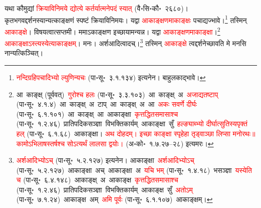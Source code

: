 \begin{sloppypar}
यथा कौमुद्यां \textcolor{red}{क्रिया\-विनिमये द्योत्ये कर्तर्यात्मनेपदं स्यात्} (वै॰सि॰कौ॰~२६८०)। कृत\-भगवद्दर्शनस्यान्यत्काङ्क्षणं स्पष्टं क्रिया\-विनिमयः। यद्वा \textcolor{red}{आकाङ्क्षणमाकाङ्क्षः} पचाद्यज्भावे।\footnote{\textcolor{red}{नन्दि\-ग्रहि\-पचादिभ्यो ल्युणिन्यचः} (पा॰सू॰~३.१.१३४) इत्यनेन। बाहुलकाद्भावे।} तस्मिन् \textcolor{red}{आकाङ्क्षे}। विषयत्वात्सप्तमी। ममाऽकाङ्क्षण इच्छायामन्यन्न। यद्वा \textcolor{red}{आकाङ्क्षणमाकाङ्क्षा}।\footnote{आ~काङ्क्ष् (पूर्ववत्)~\arrow \textcolor{red}{गुरोश्च हलः} (पा॰सू॰~३.३.१०३)~\arrow आ~काङ्क्ष्~अ~\arrow \textcolor{red}{अजाद्यतष्टाप्‌} (पा॰सू॰~४.१.४)~\arrow आ~काङ्क्ष्~अ~टाप्~\arrow आ~काङ्क्ष्~अ~आ~\arrow \textcolor{red}{अकः सवर्णे दीर्घः} (पा॰सू॰~६.१.१०१)~\arrow आ~काङ्क्ष्~आ~\arrow आकाङ्क्षा~\arrow \textcolor{red}{कृत्तद्धित\-समासाश्च} (पा॰सू॰~१.२.४६)~\arrow प्रातिपदिक\-सञ्ज्ञा~\arrow विभक्ति\-कार्यम्~\arrow आकाङ्क्षा~सुँ~\arrow \textcolor{red}{हल्ङ्याब्भ्यो दीर्घात्सुतिस्यपृक्तं हल्} (पा॰सू॰~६.१.६८)~\arrow आकाङ्क्षा। \textcolor{red}{अथ दोहदम्। इच्छा काङ्क्षा स्पृहेहा तृड्वाञ्छा लिप्सा मनोरथः॥ कामोऽभिलाषस्तर्षश्च सोऽत्यर्थं लालसा द्वयोः।} (अ॰को॰~१.७.२७–२८) इत्यमरः।} \textcolor{red}{आकाङ्क्षाऽस्त्यस्येत्याकाङ्क्षम्}। मनः। अर्शआदित्वादच्।\footnote{\textcolor{red}{अर्शआदिभ्योऽच्} (पा॰सू॰~५.२.१२७) इत्यनेन। आकाङ्क्षा~\arrow \textcolor{red}{अर्शआदिभ्योऽच्} (पा॰सू॰~५.२.१२७)~\arrow आकाङ्क्षा~अच्~\arrow आकाङ्क्षा~अ~\arrow \textcolor{red}{यचि भम्} (पा॰सू॰~१.४.१८)~\arrow भ\-सञ्ज्ञा~\arrow \textcolor{red}{यस्येति च} (पा॰सू॰~६.४.१४८)~\arrow आकाङ्क्ष्~अ~\arrow आकाङ्क्ष~\arrow \textcolor{red}{कृत्तद्धित\-समासाश्च} (पा॰सू॰~१.२.४६)~\arrow प्रातिपदिक\-सञ्ज्ञा~\arrow विभक्ति\-कार्यम्~\arrow आकाङ्क्ष~सुँ~\arrow \textcolor{red}{अतोऽम्} (पा॰सू॰~७.१.२४)~\arrow आकाङ्क्ष~अम्~\arrow \textcolor{red}{अमि पूर्वः} (पा॰सू॰~६.१.१०७)~\arrow आकाङ्क्षम्।} तस्मिन् \textcolor{red}{आकाङ्क्षे} त्वद्दर्शनेच्छावति मे मनसि नान्यत्किञ्चित्।\end{sloppypar}
